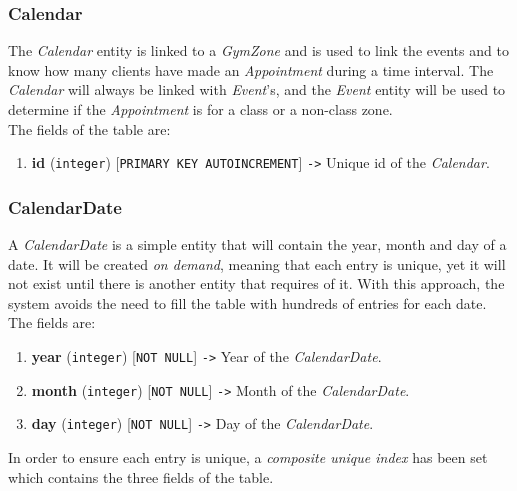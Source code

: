 \documentclass[a4paper, 12pt, oneside]{book}
\begin{document}
\subsubsection{Calendar}
The \emph{Calendar} entity is linked to a \emph{GymZone} and is used to link the events and to know how many clients have made an \emph{Appointment} during a time interval. The \emph{Calendar} will always be linked with \emph{Event}'s, and the \emph{Event} entity will be used to determine if the \emph{Appointment} is for a class or a non-class zone.
\\[8pt]
The fields of the table are:
\begin{enumerate}[label = -]
	\item \textbf{id} (\texttt{integer}) [\texttt{PRIMARY KEY AUTOINCREMENT}] \texttt{->} Unique id of the \emph{Calendar}.
\end{enumerate}
\subsubsection{CalendarDate}
A \emph{CalendarDate} is a simple entity that will contain the year, month and day of a date. It will be created \emph{on demand}, meaning that each entry is unique, yet it will not exist until there is another entity that requires of it. With this approach, the system avoids the need to fill the table with hundreds of entries for each date. The fields are:
\begin{enumerate}[label = -]
	\item \textbf{year} (\texttt{integer}) [\texttt{NOT NULL}] \texttt{->} Year of the \emph{CalendarDate}.
	\item \textbf{month} (\texttt{integer}) [\texttt{NOT NULL}] \texttt{->} Month of the \emph{CalendarDate}.
	\item \textbf{day} (\texttt{integer}) [\texttt{NOT NULL}] \texttt{->} Day of the \emph{CalendarDate}.
\end{enumerate}
In order to ensure each entry is unique, a \emph{composite unique index} has been set which contains the three fields of the table.
\end{document}
